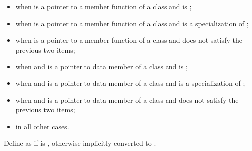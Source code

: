 \begin{itemize}
\item {} when  is a pointer to a
member function of a class 
and  is ;

\item {} when  is a pointer to a
member function of a class 
and  is a specialization of ;

\item {} when  is a pointer to a
member function of a class 
and  does not satisfy the previous two items;

\item {} when  and  is a pointer to
data member of a class 
and  is ;
    
\item {} when  and  is a pointer to
data member of a class 
and  is a specialization of ;

\item {} when  and  is a pointer to
data member of a class 
and  does not satisfy the previous two items;

\item {} in all other cases.
\end{itemize}

\pnum
{}%
Define  as
if  is \cv{} , otherwise
 implicitly converted
to .

